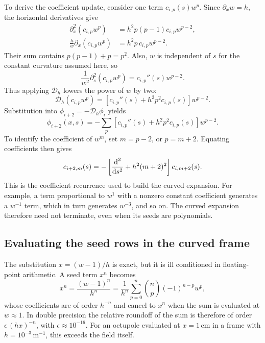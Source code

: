 To derive the coefficient update, consider one term \(c_{i,p}(s)w^p\).
Since \(\partial_xw=h\), the horizontal derivatives give
\begin{align}
 \partial_x^2(c_{i,p}w^p)&=h^2p(p-1)c_{i,p}w^{p-2},\\
 \frac{h}{w}\partial_x(c_{i,p}w^p)&=h^2p\,c_{i,p}w^{p-2}.
\end{align}
Their sum contains \(p(p-1)+p=p^2\). Also, \(w\) is independent of
\(s\) for the constant curvature assumed here, so
\begin{equation}
 \frac{1}{w^2}\partial_s^2(c_{i,p}w^p)
 =c_{i,p}''(s)w^{p-2}.
\end{equation}
Thus applying \(\mathcal D_h\) lowers the power of \(w\) by two:
\begin{equation}
 \mathcal D_h(c_{i,p}w^p)
 =\left[c_{i,p}''(s)+h^2p^2c_{i,p}(s)\right]w^{p-2}.
\end{equation}
Substitution into \(\phi_{i+2}=-\mathcal D_h\phi_i\) yields
\begin{equation}
 \phi_{i+2}(x,s)
 =-\sum_p\left[c_{i,p}''(s)+h^2p^2c_{i,p}(s)\right]w^{p-2}.
\end{equation}
To identify the coefficient of \(w^m\), set \(m=p-2\), or
\(p=m+2\). Equating coefficients then gives
\begin{equation}
 c_{i+2,m}(s)=-\left[\frac{\text{d}^2}{\text{d} s^2}
                         +h^2(m+2)^2\right]c_{i,m+2}(s).
 \label{bfe:curved-coefficients}
\end{equation}
This is the coefficient recurrence used to build the curved expansion.
For example, a term proportional to \(w^1\) with a nonzero constant
coefficient generates a \(w^{-1}\) term, which in turn generates
\(w^{-3}\), and so on. The curved expansion therefore need not terminate,
even when its seeds are polynomials.

\subsection{Evaluating the seed rows in the curved frame}
\label{sec:curved-seed-rows}

The substitution \(x=(w-1)/h\) is exact, but it is ill conditioned in
floating-point arithmetic. A seed term \(x^n\) becomes
\begin{equation}
 x^n=\frac{(w-1)^n}{h^n}
    =\frac{1}{h^n}\sum_{p=0}^{n}\binom{n}{p}(-1)^{n-p}w^p,
\end{equation}
whose coefficients are of order \(h^{-n}\) and cancel to \(x^n\) when the
sum is evaluated at \(w\approx1\). In double precision the relative
roundoff of the sum is therefore of order \(\epsilon\,(hx)^{-n}\), with
\(\epsilon\approx10^{-16}\). For an octupole evaluated at \(x=1\,\mathrm{cm}\)
in a frame with \(h=10^{-3}\,\mathrm{m}^{-1}\), this exceeds the field itself.

